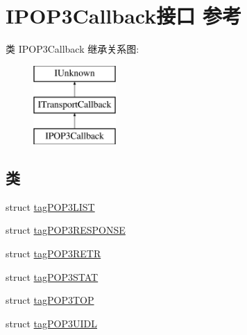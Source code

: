 \hypertarget{interface_i_p_o_p3_callback}{}\section{I\+P\+O\+P3\+Callback接口 参考}
\label{interface_i_p_o_p3_callback}
类 I\+P\+O\+P3\+Callback 继承关系图\+:\begin{figure}[H]
\begin{center}
\leavevmode
\includegraphics[height=3.000000cm]{interface_i_p_o_p3_callback}
\end{center}
\end{figure}
\subsection*{类}
\begin{DoxyCompactItemize}
\item 
struct \hyperlink{struct_i_p_o_p3_callback_1_1tag_p_o_p3_l_i_s_t}{tag\+P\+O\+P3\+L\+I\+ST}
\item 
struct \hyperlink{struct_i_p_o_p3_callback_1_1tag_p_o_p3_r_e_s_p_o_n_s_e}{tag\+P\+O\+P3\+R\+E\+S\+P\+O\+N\+SE}
\item 
struct \hyperlink{struct_i_p_o_p3_callback_1_1tag_p_o_p3_r_e_t_r}{tag\+P\+O\+P3\+R\+E\+TR}
\item 
struct \hyperlink{struct_i_p_o_p3_callback_1_1tag_p_o_p3_s_t_a_t}{tag\+P\+O\+P3\+S\+T\+AT}
\item 
struct \hyperlink{struct_i_p_o_p3_callback_1_1tag_p_o_p3_t_o_p}{tag\+P\+O\+P3\+T\+OP}
\item 
struct \hyperlink{struct_i_p_o_p3_callback_1_1tag_p_o_p3_u_i_d_l}{tag\+P\+O\+P3\+U\+I\+DL}
\end{DoxyCompactItemize}
